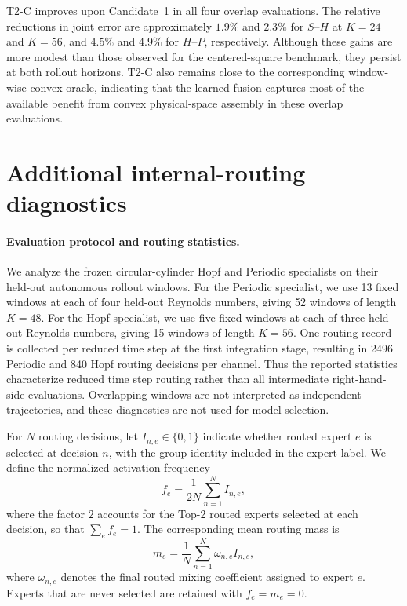 \documentclass{article}
\begin{document}
T2-C improves upon Candidate~1 in all four overlap evaluations.
The relative reductions in joint error are approximately $1.9\%$ and
$2.3\%$ for $S$--$H$ at $K=24$ and $K=56$, and $4.5\%$ and $4.9\%$
for $H$--$P$, respectively. Although these gains are more modest than those observed for the centered-square benchmark, they persist at both rollout horizons. T2-C also remains close to the corresponding window-wise convex oracle, indicating that the learned fusion captures most of the available benefit from convex physical-space assembly in these overlap evaluations.

\FloatBarrier
\section{Additional internal-routing diagnostics}
\label{app:internal_routing}

\paragraph{Evaluation protocol and routing statistics.}
We analyze the frozen circular-cylinder Hopf and Periodic specialists on their held-out autonomous rollout windows.
For the Periodic specialist, we use 13 fixed windows at each of four held-out Reynolds numbers, giving 52 windows of length $K=48$. For the Hopf specialist, we use five fixed windows at each of three held-out Reynolds numbers, giving 15 windows of length $K=56$. One routing record is collected per reduced time step at the first integration stage, resulting in 2496 Periodic and 840 Hopf routing decisions per channel. Thus the reported statistics characterize reduced time step routing rather than all intermediate right-hand-side evaluations. Overlapping windows are not interpreted as independent trajectories, and these diagnostics are not used for model selection.

For $N$ routing decisions, let $I_{n,e}\in\{0,1\}$ indicate whether routed expert $e$ is selected at decision $n$, with the group identity included in the expert label. We define the normalized activation frequency
\begin{equation}
  f_e
  =
  \frac{1}{2N}
  \sum_{n=1}^{N} I_{n,e},
  \label{eq:app_routing_frequency}
\end{equation}
where the factor $2$ accounts for the Top-2 routed experts selected at each decision, so that $\sum_e f_e=1$. The corresponding mean routing mass is
\begin{equation}
  m_e
  =
  \frac{1}{N}
  \sum_{n=1}^{N}
  \omega_{n,e}I_{n,e},
  \label{eq:app_routing_mass}
\end{equation}
where $\omega_{n,e}$ denotes the final routed mixing coefficient assigned to expert $e$. Experts that are never selected are retained with $f_e=m_e=0$.
\end{document}
